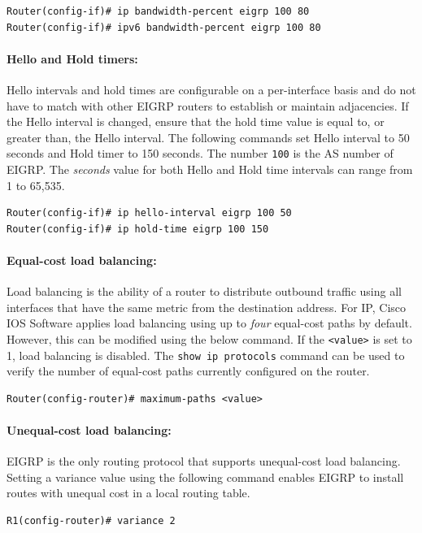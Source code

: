 \begin{verbatim}
Router(config-if)# ip bandwidth-percent eigrp 100 80
Router(config-if)# ipv6 bandwidth-percent eigrp 100 80
\end{verbatim}

\paragraph{Hello and Hold timers:} Hello intervals and hold times are configurable on a per-interface basis and do not have to match with other EIGRP routers to establish or maintain adjacencies. If the Hello interval is changed, ensure that the hold time value is equal to, or greater than, the Hello interval. The following commands set Hello interval to 50 seconds and Hold timer to 150 seconds. The number \verb|100| is the AS number of EIGRP. \note The \emph{seconds} value for both Hello and Hold time intervals can range from 1 to 65,535. 

\begin{verbatim}
Router(config-if)# ip hello-interval eigrp 100 50
Router(config-if)# ip hold-time eigrp 100 150
\end{verbatim}

\paragraph{Equal-cost load balancing:} Load balancing is the ability of a router to distribute outbound traffic using all interfaces that have the same metric from the destination address. For IP, Cisco IOS Software applies load balancing using up to \emph{four} equal-cost paths by default. However, this can be modified using the below command. If the \verb|<value>| is set to 1, load balancing is disabled.  The \verb|show ip protocols| command can be used to verify the number of equal-cost paths currently configured on the router.

\begin{verbatim}
Router(config-router)# maximum-paths <value>
\end{verbatim} 

\paragraph{Unequal-cost load balancing:} EIGRP is the only routing protocol that supports unequal-cost load balancing. Setting a variance value using the following command enables EIGRP to install routes with unequal cost in a local routing table. 

\begin{verbatim}
R1(config-router)# variance 2
\end{verbatim}

